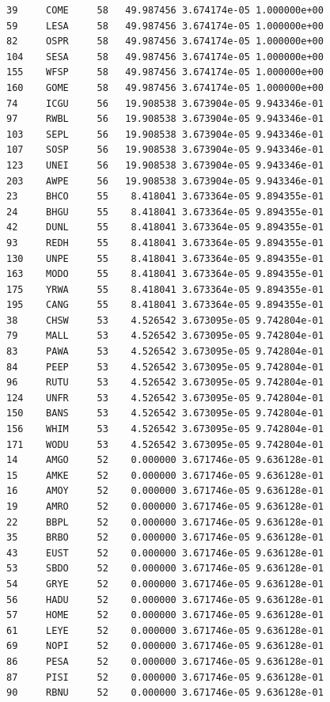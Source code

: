 \documentclass{statsoc}
\begin{document}
\begin{lstlisting}
39     COME     58   49.987456 3.674174e-05 1.000000e+00
59     LESA     58   49.987456 3.674174e-05 1.000000e+00
82     OSPR     58   49.987456 3.674174e-05 1.000000e+00
104    SESA     58   49.987456 3.674174e-05 1.000000e+00
155    WFSP     58   49.987456 3.674174e-05 1.000000e+00
160    GOME     58   49.987456 3.674174e-05 1.000000e+00
74     ICGU     56   19.908538 3.673904e-05 9.943346e-01
97     RWBL     56   19.908538 3.673904e-05 9.943346e-01
103    SEPL     56   19.908538 3.673904e-05 9.943346e-01
107    SOSP     56   19.908538 3.673904e-05 9.943346e-01
123    UNEI     56   19.908538 3.673904e-05 9.943346e-01
203    AWPE     56   19.908538 3.673904e-05 9.943346e-01
23     BHCO     55    8.418041 3.673364e-05 9.894355e-01
24     BHGU     55    8.418041 3.673364e-05 9.894355e-01
42     DUNL     55    8.418041 3.673364e-05 9.894355e-01
93     REDH     55    8.418041 3.673364e-05 9.894355e-01
130    UNPE     55    8.418041 3.673364e-05 9.894355e-01
163    MODO     55    8.418041 3.673364e-05 9.894355e-01
175    YRWA     55    8.418041 3.673364e-05 9.894355e-01
195    CANG     55    8.418041 3.673364e-05 9.894355e-01
38     CHSW     53    4.526542 3.673095e-05 9.742804e-01
79     MALL     53    4.526542 3.673095e-05 9.742804e-01
83     PAWA     53    4.526542 3.673095e-05 9.742804e-01
84     PEEP     53    4.526542 3.673095e-05 9.742804e-01
96     RUTU     53    4.526542 3.673095e-05 9.742804e-01
124    UNFR     53    4.526542 3.673095e-05 9.742804e-01
150    BANS     53    4.526542 3.673095e-05 9.742804e-01
156    WHIM     53    4.526542 3.673095e-05 9.742804e-01
171    WODU     53    4.526542 3.673095e-05 9.742804e-01
14     AMGO     52    0.000000 3.671746e-05 9.636128e-01
15     AMKE     52    0.000000 3.671746e-05 9.636128e-01
16     AMOY     52    0.000000 3.671746e-05 9.636128e-01
19     AMRO     52    0.000000 3.671746e-05 9.636128e-01
22     BBPL     52    0.000000 3.671746e-05 9.636128e-01
35     BRBO     52    0.000000 3.671746e-05 9.636128e-01
43     EUST     52    0.000000 3.671746e-05 9.636128e-01
53     SBDO     52    0.000000 3.671746e-05 9.636128e-01
54     GRYE     52    0.000000 3.671746e-05 9.636128e-01
56     HADU     52    0.000000 3.671746e-05 9.636128e-01
57     HOME     52    0.000000 3.671746e-05 9.636128e-01
61     LEYE     52    0.000000 3.671746e-05 9.636128e-01
69     NOPI     52    0.000000 3.671746e-05 9.636128e-01
86     PESA     52    0.000000 3.671746e-05 9.636128e-01
87     PISI     52    0.000000 3.671746e-05 9.636128e-01
90     RBNU     52    0.000000 3.671746e-05 9.636128e-01

\end{lstlisting}
\end{document}
